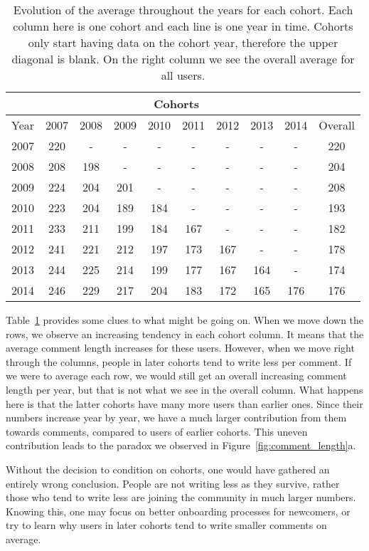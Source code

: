 \begin{table}[!tb]
\centering
\tabcolsep=0.07cm
\singlespacing
\fontsize{9pt}{11.5pt}\selectfont
\begin{tabular}{|c|c|c|c|c|c|c|c|c|c|}
\cline{2-9}
\multicolumn{1}{c|}{} & \multicolumn{8}{c|}{Cohorts} \\ \hline
Year & 2007 & 2008 & 2009 & 2010 & 2011 & 2012 & 2013 & 2014 & Overall\\ \hline
2007 & 220 & - & - & - & - & - & - & - & 220 \\ \hline
2008 & 208 & 198 & - & - & - & - & - & - & 204 \\ \hline
2009 & 224 & 204 & 201 & - & - & - & - & - & 208 \\ \hline
2010 & 223 & 204 & 189 & 184 & - & - & - & - & 193 \\ \hline
2011 & 233 & 211 & 199 & 184 & 167 & - & - & - & 182 \\ \hline
2012 & 241 & 221 & 212 & 197 & 173 & 167 & - & - & 178 \\ \hline
2013 & 244 & 225 & 214 & 199 & 177 & 167 & 164 & - & 174 \\ \hline
2014 & 246 & 229 & 217 & 204 & 183 & 172 & 165 & 176 & 176 \\ \hline
\end{tabular}
\caption{Evolution of the average throughout the years for each cohort. Each column here is one cohort and each line is one year in time. Cohorts only start having data on the cohort year, therefore the upper diagonal is blank. On the right column we see the overall average for all users.}
\label{tab:simpson}
\end{table}

Table~\ref{tab:simpson} provides some clues to what might be going on. When we move down the rows, we observe an increasing tendency in each cohort column. It means that the average comment length increases for these users. However, when we move right through the columns, people in later cohorts tend to write less per comment. If we were to average each row, we would still get an overall increasing comment length per year, but that is not what we see in the overall column. What happens here is that the latter cohorts have many more users than earlier ones. Since their numbers increase year by year, we have a much larger contribution from them towards comments, compared to users of earlier cohorts. This uneven contribution leads to the paradox we observed in Figure~\ref{fig:comment_length}a. 

Without the decision to condition on cohorts, one would have gathered an entirely wrong conclusion. People are not writing less as they survive, rather those who tend to write less are joining the community in much larger numbers. Knowing this, one may focus on better onboarding processes for newcomers, or try to learn why users in later cohorts tend to write smaller comments on average.  

